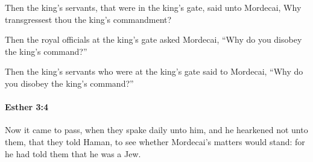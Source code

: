 			\begin{versebox}
					\item[BHS] 
					\item[LXX] 
					\item[ASV] Then the king's servants, that were in the king's gate, said unto Mordecai, Why transgressest thou the king's commandment?
					\item[NIV] Then the royal officials at the king’s gate asked Mordecai, “Why do you disobey the king’s command?”
					\item[NRSV] Then the king’s servants who were at the king’s gate said to Mordecai, “Why do you disobey the king’s command?”
			\end{versebox}

		\paragraph{Esther 3:4} %
			\label{ESTHER-3-4}

			Now it came to pass, when they spake daily unto him, and he hearkened not unto them, that they told Haman, to see whether Mordecai’s matters would stand: for he had told them that he was a Jew.

